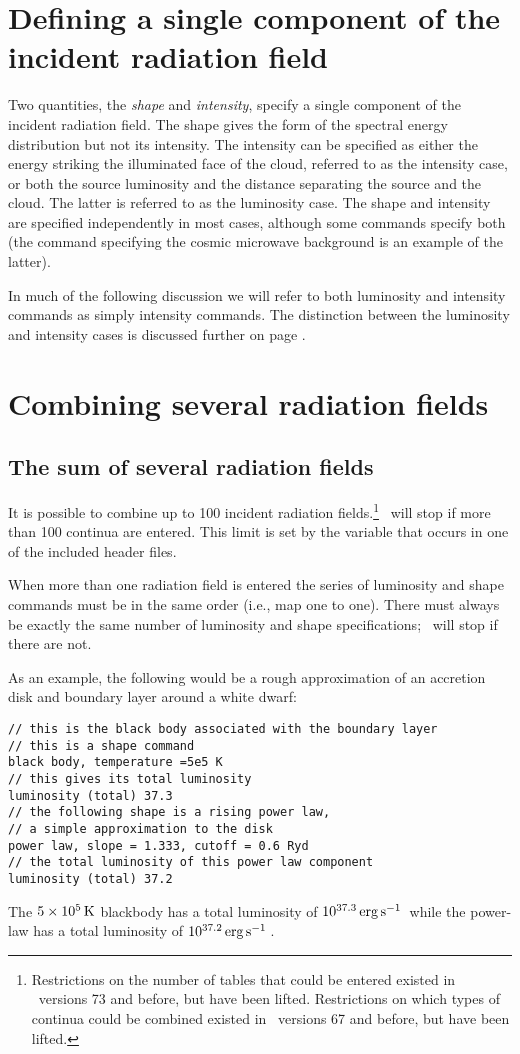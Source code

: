\section{Defining a single component of the incident radiation field}

Two quantities, the \emph{shape} and \emph{intensity},
specify a single component of the incident radiation field.
The shape gives the form of the spectral energy distribution
but not its intensity.
The intensity can be specified as either the energy striking
the illuminated face of the cloud, referred to as
the intensity case, or both the source luminosity and the
distance separating the source and the cloud.  
The latter is referred to as the luminosity case.
The shape and intensity are specified independently
in most cases, although some commands specify both 
(the command specifying
the cosmic microwave background is an example of the latter).

In much of the following discussion we will refer to both
luminosity and intensity commands as simply intensity commands.
The distinction between the luminosity and intensity cases
is discussed further on page \pageref{sec:IntensityLuminosityCases}.

\section{Combining several radiation fields}

\subsection{The sum of several radiation fields}

It is possible to combine up to 100 incident radiation fields.\footnote{
Restrictions on the number of tables that could be entered existed
in \Cloudy\ versions 73 and before, but have been lifted. Restrictions on
which types of continua could be combined existed in \Cloudy\ versions 67
and before, but have been lifted.}   \Cloudy\ will stop if
more than 100 continua are entered.
This limit is set by the variable 
that occurs in one of the included header files.

When more than one radiation field is entered the series of luminosity and
shape commands must be in the same order (i.e., map one to one).  There
must always be exactly the same number of luminosity and shape
specifications; \Cloudy\ will stop if there are not.

As an example, the following would be a rough approximation of an
accretion disk and boundary layer around a white dwarf:
\begin{verbatim}
// this is the black body associated with the boundary layer
// this is a shape command
black body, temperature =5e5 K
// this gives its total luminosity 
luminosity (total) 37.3
// the following shape is a rising power law, 
// a simple approximation to the disk 
power law, slope = 1.333, cutoff = 0.6 Ryd
// the total luminosity of this power law component
luminosity (total) 37.2
\end{verbatim}
The $5\times 10^5 {\rm\thinspace K}$ blackbody has a total luminosity of
$10^{37.3} \mbox{${\rm\thinspace erg}{\rm\thinspace s}^{-1}\,$}$ while
the power-law has a total luminosity of
$10^{37.2} \mbox{${\rm\thinspace erg}{\rm\thinspace s}^{-1}\,$} $.

